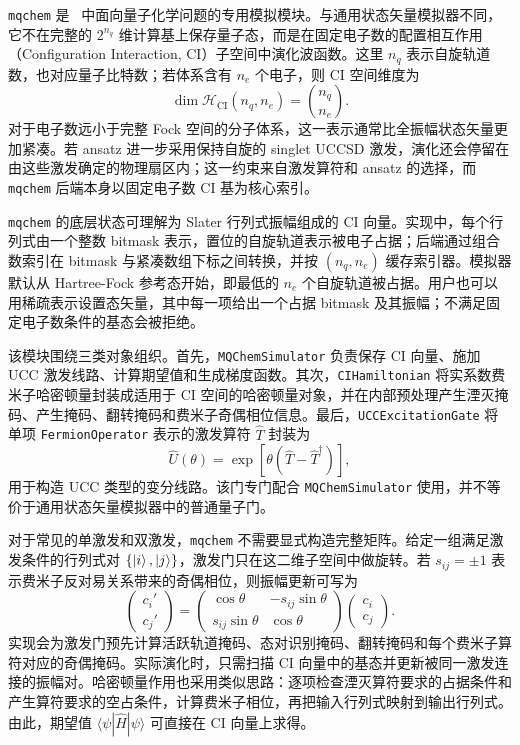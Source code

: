 \texttt{mqchem} 是 \MindQuantum\ 中面向量子化学问题的专用模拟模块。与通用状态矢量模拟器不同，它不在完整的 $2^{n_q}$ 维计算基上保存量子态，而是在固定电子数的配置相互作用（Configuration Interaction, CI）子空间中演化波函数。这里 $n_q$ 表示自旋轨道数，也对应量子比特数；若体系含有 $n_e$ 个电子，则 CI 空间维度为
\begin{equation}
    \dim \mathcal{H}_{\mathrm{CI}}(n_q,n_e)=\binom{n_q}{n_e}.
\end{equation}
对于电子数远小于完整 Fock 空间的分子体系，这一表示通常比全振幅状态矢量更加紧凑。若 ansatz 进一步采用保持自旋的 singlet UCCSD 激发，演化还会停留在由这些激发确定的物理扇区内；这一约束来自激发算符和 ansatz 的选择，而 \texttt{mqchem} 后端本身以固定电子数 CI 基为核心索引。

\texttt{mqchem} 的底层状态可理解为 Slater 行列式振幅组成的 CI 向量。实现中，每个行列式由一个整数 bitmask 表示，置位的自旋轨道表示被电子占据；后端通过组合数索引在 bitmask 与紧凑数组下标之间转换，并按 $(n_q,n_e)$ 缓存索引器。模拟器默认从 Hartree-Fock 参考态开始，即最低的 $n_e$ 个自旋轨道被占据。用户也可以用稀疏表示设置态矢量，其中每一项给出一个占据 bitmask 及其振幅；不满足固定电子数条件的基态会被拒绝。

该模块围绕三类对象组织。首先，\texttt{MQChemSimulator} 负责保存 CI 向量、施加 UCC 激发线路、计算期望值和生成梯度函数。其次，\texttt{CIHamiltonian} 将实系数费米子哈密顿量封装成适用于 CI 空间的哈密顿量对象，并在内部预处理产生湮灭掩码、产生掩码、翻转掩码和费米子奇偶相位信息。最后，\texttt{UCCExcitationGate} 将单项 \texttt{FermionOperator} 表示的激发算符 $\hat{T}$ 封装为
\begin{equation}
    \hat{U}(\theta)=\exp\left[\theta\left(\hat{T}-\hat{T}^{\dagger}\right)\right],
\end{equation}
用于构造 UCC 类型的变分线路。该门专门配合 \texttt{MQChemSimulator} 使用，并不等价于通用状态矢量模拟器中的普通量子门。

对于常见的单激发和双激发，\texttt{mqchem} 不需要显式构造完整矩阵。给定一组满足激发条件的行列式对 $\{\ket{i},\ket{j}\}$，激发门只在这二维子空间中做旋转。若 $s_{ij}=\pm1$ 表示费米子反对易关系带来的奇偶相位，则振幅更新可写为
\begin{equation}
    \begin{pmatrix}
        c_i' \\
        c_j'
    \end{pmatrix}
    =
    \begin{pmatrix}
        \cos\theta       & -s_{ij}\sin\theta \\
        s_{ij}\sin\theta & \cos\theta
    \end{pmatrix}
    \begin{pmatrix}
        c_i \\
        c_j
    \end{pmatrix}.
\end{equation}
实现会为激发门预先计算活跃轨道掩码、态对识别掩码、翻转掩码和每个费米子算符对应的奇偶掩码。实际演化时，只需扫描 CI 向量中的基态并更新被同一激发连接的振幅对。哈密顿量作用也采用类似思路：逐项检查湮灭算符要求的占据条件和产生算符要求的空占条件，计算费米子相位，再把输入行列式映射到输出行列式。由此，期望值 $\langle\psi|\hat{H}|\psi\rangle$ 可直接在 CI 向量上求得。

